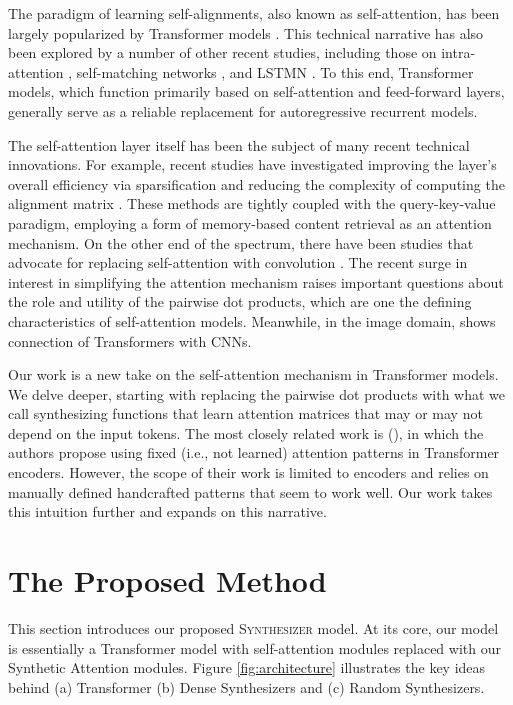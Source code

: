 \documentclass{article} \usepackage{iclr2021_conference,times}
\begin{document}
The paradigm of learning self-alignments, also known as self-attention, has been largely popularized by Transformer models \citep{vaswani2017attention}. This technical narrative has also been explored by a number of other recent studies, including those on intra-attention \citep{parikh2016decomposable}, self-matching networks \citep{wang2017gated}, and LSTMN \citep{cheng2016long}. To this end, Transformer models, which function primarily based on self-attention and feed-forward layers, generally serve as a reliable replacement for autoregressive recurrent models. 

The self-attention layer itself has been the subject of many recent technical innovations. For example, recent studies have investigated improving the layer's overall efficiency via sparsification and reducing the complexity of computing the alignment matrix \citep{child2019generating,kitaev2020reformer,huang2018music,tay2020sparse,Beltagy2020Longformer}. These methods are tightly coupled with the query-key-value paradigm, employing a form of memory-based content retrieval as an attention mechanism. On the other end of the spectrum, there have been studies that advocate for replacing self-attention with convolution \citep{wu2019pay}. The recent surge in interest in simplifying the attention mechanism raises important questions about the role and  utility of the pairwise dot products, which are one the defining characteristics of self-attention models. Meanwhile, in the image domain, \citep{cordonnier2019relationship} shows connection of Transformers with CNNs.

Our work is a new take on the self-attention mechanism in Transformer models. We delve deeper, starting with replacing the pairwise dot products with what we call synthesizing functions that learn attention matrices that may or may not depend on the input tokens. The most closely related work is (\citep{raganato2020fixed}), in which the authors propose using fixed (i.e., not learned) attention patterns in Transformer encoders. However, the scope of their work is limited to encoders and relies on manually defined handcrafted patterns that seem to work well. Our work takes this intuition further and expands on this narrative.




\section{The Proposed Method}
This section introduces our proposed \textsc{Synthesizer} model. At its core, our model is essentially a Transformer model with self-attention modules replaced with our Synthetic Attention modules. Figure \ref{fig:architecture} illustrates the key ideas behind (a) Transformer (b) Dense Synthesizers and (c) Random Synthesizers.
\end{document}
